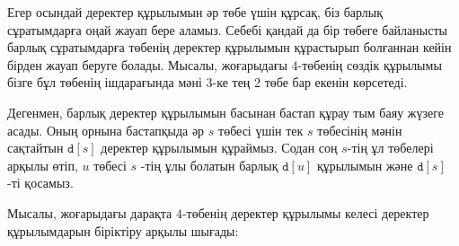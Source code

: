 Егер осындай деректер құрылымын әр төбе үшін құрсақ, біз 
барлық сұратымдарға оңай жауап бере аламыз. Себебі қандай да бір төбеге
байланысты барлық сұратымдарға төбенің деректер құрылымын
құрастырып болғаннан кейін бірден жауап беруге болады.
Мысалы, жоғарыдағы $4$-төбенің сөздік құрылымы бізге 
бұл төбенің ішдарағында мәні 3-ке тең 2 төбе бар екенін 
көрсетеді.

Дегенмен, барлық деректер құрылымын басынан бастап
құрау тым баяу жүзеге асады.
Оның орнына бастапқыда әр $s$ төбесі үшін тек $s$ төбесінің мәнін сақтайтын  $\texttt{d}[s]$ деректер 
құрылымын құраймыз. Содан соң $s$-тің ұл төбелері арқылы өтіп, $u$ төбесі $s$ -тің ұлы болатын барлық $\texttt{d}[u]$ құрылымын және $\texttt{d}[s]$ -ті қосамыз.

Мысалы, жоғарыдағы дарақта $4$-төбенің деректер құрылымы
келесі деректер құрылымдарын біріктіру арқылы шығады:

\begin{center}
\end{center}

